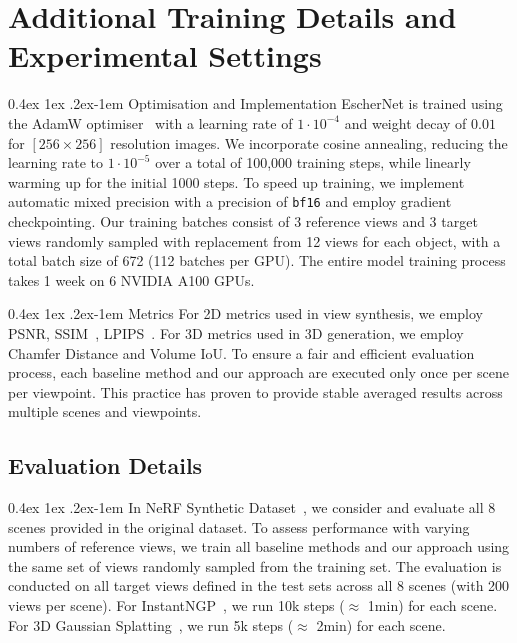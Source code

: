 \documentclass[10pt,twocolumn,letterpaper]{article}
\makeatletter
\renewcommand{\paragraph}{%
  \@startsection{paragraph}{4}%
  {\z@}{0.4ex \@plus 1ex \@minus .2ex}{-1em}%
  {\normalfont\normalsize\bfseries}%
}
\makeatother
\begin{document}
\section{Additional Training Details and Experimental Settings}
\label{app:training}

\paragraph{Optimisation and Implementation}  EscherNet is trained using the AdamW optimiser~\cite{loshchilov2018adamw} with a learning rate of $1\cdot 10^{-4}$ and weight decay of $0.01$ for $[256\times 256]$ resolution images. We incorporate cosine annealing, reducing the learning rate to $1\cdot 10^{-5}$ over a total of 100,000 training steps, while linearly warming up for the initial 1000 steps. To speed up training, we implement automatic mixed precision with a precision of {\tt bf16} and employ gradient checkpointing. Our training batches consist of 3 reference views and 3 target views randomly sampled with replacement from 12 views for each object, with a total batch size of 672 (112 batches per GPU). The entire model training process takes 1 week on 6 NVIDIA A100 GPUs.

\paragraph{Metrics} 
For 2D metrics used in view synthesis, we employ PSNR, SSIM~\cite{wang2004image}, LPIPS~\cite{zhang2018unreasonable}. For 3D metrics used in 3D generation, we employ Chamfer Distance and Volume IoU. To ensure a fair and efficient evaluation process, each baseline method and our approach are executed only once per scene per viewpoint. This practice has proven to provide stable averaged results across multiple scenes and viewpoints.

\subsection{Evaluation Details}
\paragraph{In NeRF Synthetic Dataset~\cite{mildenhall2020nerf},} we consider and evaluate all 8 scenes provided in the original dataset. To assess performance with varying numbers of reference views, we train all baseline methods and our approach using the same set of views randomly sampled from the training set. The evaluation is conducted on all target views defined in the test sets across all 8 scenes (with 200 views per scene). For InstantNGP~\cite{muller2022instant}, we run 10k steps ($\approx$ 1min) for each scene. For 3D Gaussian Splatting~\cite{kerbl20233gaussian}, we run 5k steps ($\approx$ 2min) for each scene.
\end{document}
